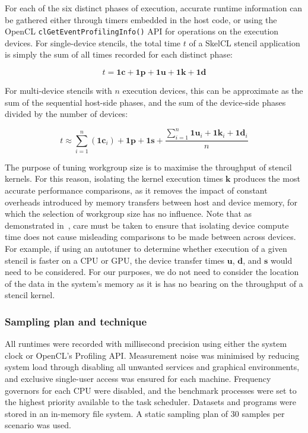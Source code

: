 For each of the six distinct phases of execution, accurate runtime
information can be gathered either through timers embedded in the host
code, or using the OpenCL \texttt{clGetEventProfilingInfo()} API for
operations on the execution devices. For single-device stencils, the
total time $t$ of a SkelCL stencil application is simply the sum of
all times recorded for each distinct phase:

\begin{equation}
t = \bm{1c} + \bm{1p} + \bm{1u} + \bm{1k} + \bm{1d}
\end{equation}

For multi-device stencils with $n$ execution devices, this can be
approximate as the sum of the sequential host-side phases, and the sum
of the device-side phases divided by the number of devices:

\begin{equation}
t \approx \sum_{i=1}^n{(\bm{1c}_{i})} + \bm{1p} + \bm{1s} +
  \frac{\sum_{i=1}^n{\bm{1u}_{i} + \bm{1k}_{i} + \bm{1d}_{i}}}{n}
\end{equation}


The purpose of tuning workgroup size is to maximise the throughput of
stencil kernels. For this reason, isolating the kernel execution times
$\bm{k}$ produces the most accurate performance comparisons, as it
removes the impact of constant overheads introduced by memory
transfers between host and device memory, for which the selection of
workgroup size has no influence. Note that as demonstrated
in~\cite{Gregg2011}, care must be taken to ensure that isolating
device compute time does not cause misleading comparisons to be made
between across devices. For example, if using an autotuner to
determine whether execution of a given stencil is faster on a CPU or
GPU, the device transfer times $\bm{u}$, $\bm{d}$, and $\bm{s}$ would
need to be considered. For our purposes, we do not need to consider
the location of the data in the system's memory as it is has no
bearing on the throughput of a stencil kernel.


\subsubsection{Sampling plan and technique}

All runtimes were recorded with millisecond precision using either the
system clock or OpenCL's Profiling API. Measurement noise was
minimised by reducing system load through disabling all unwanted
services and graphical environments, and exclusive single-user access
was ensured for each machine. Frequency governors for each CPU were
disabled, and the benchmark processes were set to the highest priority
available to the task scheduler. Datasets and programs were stored in
an in-memory file system. A static sampling plan of 30 samples per
scenario was used.  

